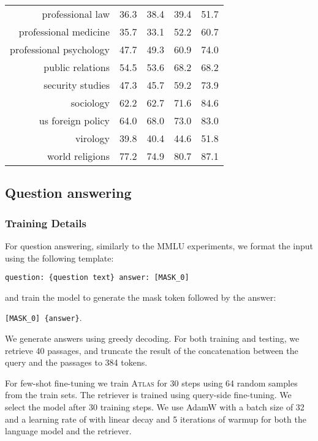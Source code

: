 \documentclass[10pt]{article} \usepackage[preprint]{tmlr}
\newcommand{\Atlas}{\textsc{Atlas}}
\begin{document}
\begin{table*}
{\begin{tabular}{r cccc}
professional law	&	36.3	&	38.4	&	39.4	&	51.7	\\
professional medicine	&	35.7	&	33.1	&	52.2	&	60.7	\\
professional psychology	&	47.7	&	49.3	&	60.9	&	74.0	\\
public relations	&	54.5	&	53.6	&	68.2	&	68.2	\\
security studies	&	47.3	&	45.7	&	59.2	&	73.9	\\
sociology	&	62.2	&	62.7	&	71.6	&	84.6	\\
us foreign policy	&	64.0	&	68.0	&	73.0	&	83.0	\\
virology	&	39.8	&	40.4	&	44.6	&	51.8	\\
world religions	&	77.2	&	74.9	&	80.7	&	87.1	\\
    \bottomrule
    \end{tabular}}
    \caption{MMLU Test set scores for the de-biased \Atlas{}-XXL using cyclic permutations for each of the 57 domains for zero-shot, 5 shot, 5-shot-multitask and the transfer setting.}
    \label{tab:full_mmlu_debias}
\end{table*}


\subsection{Question answering}
\label{app:qa}
\subsubsection{Training Details}
For question answering, similarly to the MMLU experiments, we format the input using the following template:

\texttt{question: \{question text\} answer: [MASK\_0]}

and train the model to generate the mask token followed by the answer:

\texttt{[MASK\_0] \{answer\}}.

We generate answers using greedy decoding.
For both training and testing, we retrieve 40 passages, and truncate the result of the concatenation between the query and the passages to 384 tokens.

For few-shot fine-tuning we train \Atlas{} for 30 steps using 64 random samples from the train sets.
The retriever is trained using query-side fine-tuning.
We select the model after 30 training steps.
We use AdamW with a batch size of 32 and a learning rate of  with linear decay and 5 iterations of warmup for both the language model and the retriever.
\end{document}

